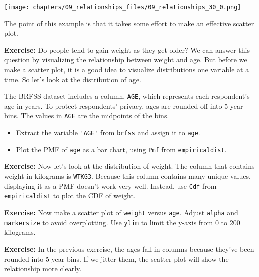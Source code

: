 \begin{lstlisting}[language=Python,style=source]
\end{lstlisting}

\begin{center}
\texttt{[image: chapters/09\_relationships\_files/09\_relationships\_30\_0.png]}
\end{center}

The point of this example is that it takes some effort to make an
effective scatter plot.

\textbf{Exercise:} Do people tend to gain weight as they get older? We
can answer this question by visualizing the relationship between weight
and age. But before we make a scatter plot, it is a good idea to
visualize distributions one variable at a time. So let's look at the
distribution of age.

The BRFSS dataset includes a column, \passthrough{\lstinline!AGE!},
which represents each respondent's age in years. To protect respondents'
privacy, ages are rounded off into 5-year bins. The values in
\passthrough{\lstinline!AGE!} are the midpoints of the bins.

\begin{itemize}
\item
  Extract the variable \passthrough{\lstinline!'AGE'!} from
  \passthrough{\lstinline!brfss!} and assign it to
  \passthrough{\lstinline!age!}.
\item
  Plot the PMF of \passthrough{\lstinline!age!} as a bar chart, using
  \passthrough{\lstinline!Pmf!} from
  \passthrough{\lstinline!empiricaldist!}.
\end{itemize}

\textbf{Exercise:} Now let's look at the distribution of weight. The
column that contains weight in kilograms is
\passthrough{\lstinline!WTKG3!}. Because this column contains many
unique values, displaying it as a PMF doesn't work very well. Instead,
use \passthrough{\lstinline!Cdf!} from
\passthrough{\lstinline!empiricaldist!} to plot the CDF of weight.

\textbf{Exercise:} Now make a scatter plot of
\passthrough{\lstinline!weight!} versus \passthrough{\lstinline!age!}.
Adjust \passthrough{\lstinline!alpha!} and
\passthrough{\lstinline!markersize!} to avoid overplotting. Use
\passthrough{\lstinline!ylim!} to limit the y-axis from 0 to 200
kilograms.

\textbf{Exercise:} In the previous exercise, the ages fall in columns
because they've been rounded into 5-year bins. If we jitter them, the
scatter plot will show the relationship more clearly.

